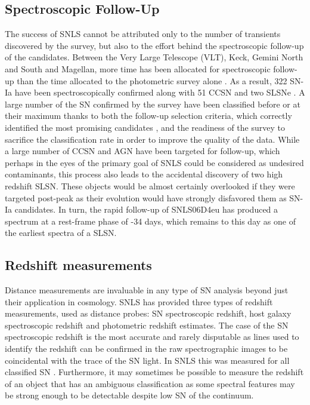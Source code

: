 \subsection{Spectroscopic Follow-Up}
The success of SNLS cannot be attributed only to the number of transients discovered by the survey, but also to the effort behind the spectroscopic follow-up of the candidates. Between the Very Large Telescope (VLT), Keck, Gemini North and South and Magellan, more time has been allocated for spectroscopic follow-up than the time allocated to the photometric survey alone \citep{Pritchet2004}. As a result, 322 SN-Ia have been spectroscopically confirmed along with 51 CCSN and two SLSNe \citep{Guy2010,Howell2005,Howell2013}. A large number of the SN confirmed by the survey have been classified before or at their maximum thanks to both the follow-up selection criteria, which correctly identified the most promising candidates \citep{Sullivan2006}, and the readiness of the survey to sacrifice the classification rate in order to improve the quality of the data. While a large number of CCSN and AGN have been targeted for follow-up, which perhaps in the eyes of the primary goal of SNLS could be considered as undesired contaminants, this process also leads to the accidental discovery of two high redshift SLSN. These objects would be almost certainly overlooked if they were targeted post-peak as their evolution would have strongly disfavored them as SN-Ia candidates. In turn, the rapid follow-up of SNLS06D4eu has produced a spectrum at a rest-frame phase of -34 days, which remains to this day as one of the earliest spectra of a SLSN.

\subsection{Redshift measurements}
\label{sec:SNLSRedshift}
Distance measurements are invaluable in any type of SN analysis beyond just their application in cosmology. SNLS has provided three types of redshift measurements, used as distance probes: SN spectroscopic redshift, host galaxy spectroscopic redshift and photometric redshift estimates. The case of the SN spectroscopic redshift is the most accurate and rarely disputable as lines used to identify the redshift can be confirmed in the raw spectrographic images to be coincidental with the trace of the SN light. In SNLS this was measured for all classified SN \citep{Howell2005,Bronder2007,Ellis2008,Balland2009}. Furthermore, it may sometimes be possible to measure the redshift of an object that has an ambiguous classification as some spectral features may be strong enough to be detectable despite low S\/N of the continuum.

